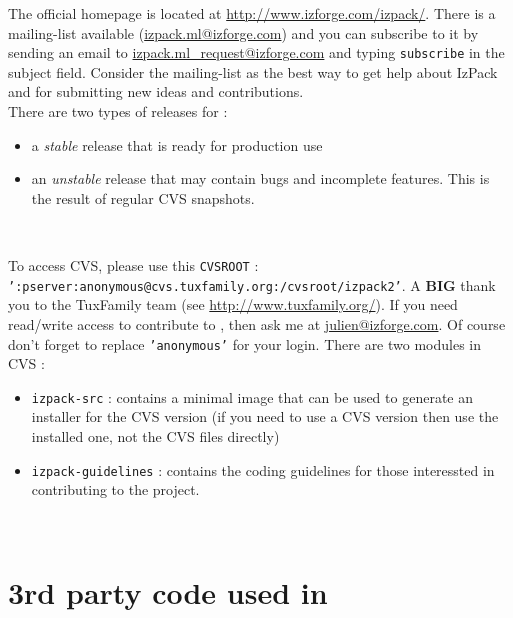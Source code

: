 The official \IzPack homepage is located at
\mbox{\url{http://www.izforge.com/izpack/}}. There is a mailing-list available 
(\url{izpack.ml@izforge.com}) and you can subscribe to it by sending an email to
\url{izpack.ml_request@izforge.com} and typing \texttt{subscribe} in the 
subject field. Consider the mailing-list as the best way to get help about
IzPack and for submitting new ideas and contributions.\\

There are two types of releases for \IzPack :
\begin{itemize}
	\item a \textit{stable} release that is ready for production use
	\item an \textit{unstable} release that may contain bugs and incomplete
	features. This is the result of regular CVS snapshots.
\end{itemize}\

To access CVS, please use this \texttt{CVSROOT} :\\
\texttt{':pserver:anonymous@cvs.tuxfamily.org:/cvsroot/izpack2'}. A \textbf{BIG}
thank you to the TuxFamily team (see \url{http://www.tuxfamily.org/}). If you need
read/write access to contribute to \IzPack, then ask me at
\url{julien@izforge.com}. Of course don't forget to replace \texttt{'anonymous'}
for your login. There are two modules in CVS :
\begin{itemize}
	\item \texttt{izpack-src} : contains a minimal image that can be used to
	generate an installer for the \IzPack CVS version (if you need to use a
	CVS version then use the installed one, not the CVS files directly)
	\item \texttt{izpack-guidelines} : contains the \IzPack coding guidelines
	for those interessted in contributing to the project.
\end{itemize}\

\section*{3rd party code used in \IzPack}

